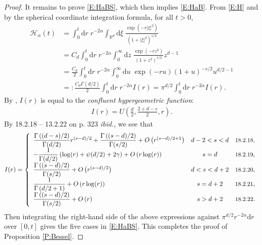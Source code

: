 \documentclass[12pt]{report}
\theoremstyle{plain}
\theoremstyle{definition}
\numberwithin{equation}{section}
\newcommand{\R}{\mathbb{R}}
\newcommand{\ud}{\ensuremath{ \mathrm{d} }}
\begin{document}
\begin{proof}
	It remains to prove \eqref{E:HaBS}, which then implies \eqref{E:HaB}. From \eqref{E:H} and by the
	spherical coordinate integration formula, for all $t>0$,
	\begin{align*}
	\mathcal{H}_{\alpha}(t)
	& = \int_0^t \ud r \; r^{-2\alpha} \int_{\R^d} \ud \xi \; \frac{\exp(-r|\xi|^2)}{ (1+|\xi|^2)^{s/2}}     \\
	& = C_d \int_0^t \ud r \; r^{-2\alpha} \int_0^\infty \ud z \; \frac{\exp(-r z^2)}{(1+z^2)^{s/2}} z^{d-1} \\
	& = \frac{C_d}{2} \int_0^t \ud r \; r^{-2\alpha} \int_0^\infty \ud u \; \exp(-r u)(1+u)^{-s/2} u^{d/2-1} \\
	& =: \frac{C_d \Gamma\left(d/2\right)}{2} \int_0^t \ud r \; r^{-2\alpha} I(r) = \pi^{d/2}\int_0^t \ud r \; r^{-2\alpha} I(r).
	\end{align*}
	By \cite[13.4.4 on p.326]{olde-daalhuis:10:confluent}, $I(r)$ is equal to the {\it confluent
		hypergeometric function}:
	\begin{align*}
	I(r) =U\left(\frac{d}{2},\frac{2+d-s}{2},r\right).
	\end{align*}
	By 18.2.18 -- 13.2.22 on p. 323 {\it ibid.}, we see that \renewcommand{\arraystretch}{2}
	\begin{align*}
	I(r) = \left\{
	\begin{array}{lcl}
	\dfrac{\Gamma\left((d-s)/2\right)}{\Gamma(d/2)}r^{(s-d)/2}+\dfrac{\Gamma\left((s-d)/2\right)}{\Gamma(s/2)} + O\left(r^{(s-d)/2+1}\right) & d-2<s<d & \text{\small 18.2.18}, \\
	-\dfrac{1}{\Gamma(d/2)}\left(\log(r) + \psi(d/2) + 2\gamma \right) +O\left(r\log(r)\right)                                               & s=d     & \text{\small 18.2.19}, \\
	\dfrac{\Gamma\left((s-d)/2\right)}{\Gamma(s/2)} + O\left(r^{(s-d)/2}\right)                                                              & d<s<d+2 & \text{\small 18.2.20}, \\
	\dfrac{1}{\Gamma\left(d/2+1\right)} + O\left(r\log(r)\right)                                                                             & s=d+2   & \text{\small 18.2.21}, \\
	\dfrac{\Gamma\left((s-d)/2\right)}{\Gamma(s/2)} + O\left(r\right)                                                                        & s>d+2   & \text{\small 18.2.22}. \\
	\end{array}
	\right.
	\end{align*}
	Then integrating the right-hand side of the above expressions against $\pi^{d/2}r^{-2\alpha}\ud r$
	over $[0,t]$ gives the five cases in \eqref{E:HaBS}. This completes the proof of Proposition
	\ref{P:Bessel}.
\end{proof}
\end{document}
